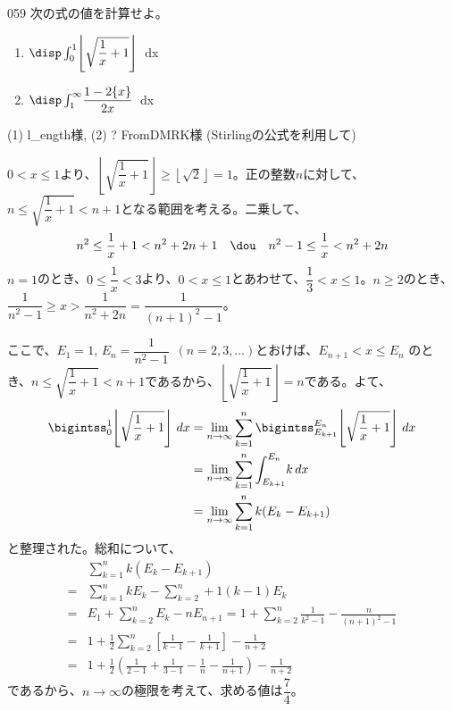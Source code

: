 \begin{thm}{059}{}{}
 次の式の値を計算せよ。
 \begin{enumerate}
  \item $\disp \int_0^1\! \left\lfloor \sqrt{\dfrac{1}{x}+1} \right\rfloor$ \,dx
  \item $\disp \int_1^\infty\! \dfrac{1-2\{x\}}{2x}$ \,dx
 \end{enumerate}
 (1)  l\_ength様, (2) \hosi ? FromDMRK様 (Stirlingの公式を利用して)
\end{thm}

$0<x\le 1$より、$\left\lfloor \sqrt{\dfrac{1}{x}+1} \right\rfloor \ge \left\lfloor\sqrt{2}\right\rfloor=1$。正の整数$n$に対して、$n\le \sqrt{\dfrac{1}{x}+1}<n+1$となる範囲を考える。二乗して、
\[ n^2\le \frac{1}{x}+1 < n^2+2n+1 \quad\dou\quad n^2-1\le \frac{1}{x}<n^2+2n \]
$n=1$のとき、$0\le \dfrac{1}{x}<3$より、$0<x\le 1$とあわせて、$\dfrac{1}{3}<x\le 1$。$n\ge 2$のとき、$\dfrac{1}{n^2-1}\ge x>\dfrac{1}{n^2+2n}=\dfrac{1}{(n+1)^2-1}$。

ここで、$E_1=1$, $E_n=\dfrac{1}{n^2-1}$~$(n=2, 3, \dots)$とおけば、$E_{n+1}<x\le E_n$ のとき、$n\le \sqrt{\dfrac{1}{x}+1}<n+1$であるから、$\left\lfloor\sqrt{\dfrac{1}{x}+1}\right\rfloor=n$である。よて、
\begin{align*}
 \bigintss_0^1\! \left\lfloor\sqrt{\frac{1}{x}+1}\right\rfloor \,dx &=\lim_{n\to\infty}\sum_{k=1}^n\bigintss_{E_{k+1}}^{E_n}\!\left\lfloor\sqrt{\frac{1}{x}+1}\right\rfloor \,dx \\
 &= \lim_{n\to\infty}\sum_{k=1}^n\int_{E_{k+1}}^{E_n}\!k\,dx \\
 &=\lim_{n\to\infty}\sum_{k=1}^n k(E_k-E_{k+1})
\end{align*}
と整理された。総和について、
\begin{align*}
 &\sum_{k=1}^nk(E_k-E_{k+1}) \\
 =& \sum_{k=1}^nkE_k - \sum_{k=2}^n+1(k-1)E_k \\
 =& E_1 + \sum_{k=2}^nE_k -nE_{n+1} = 1+\sum_{k=2}^n\frac{1}{k^2-1}-\frac{n}{(n+1)^2-1} \\
 =& 1+\frac{1}{2}\sum_{k=2}^n\left[\frac{1}{k-1}-\frac{1}{k+1}\right] - \frac{1}{n+2} \\
 =& 1+\frac{1}{2}\left(\frac{1}{2-1}+\frac{1}{3-1}-\frac{1}{n}-\frac{1}{n+1}\right) -\frac{1}{n+2}
\end{align*}
であるから、$n\to\infty$の極限を考えて、求める値は$\dfrac{7}{4}$。

